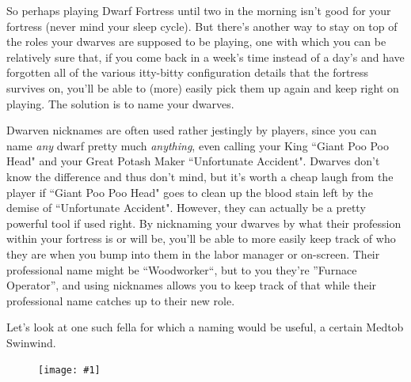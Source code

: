 \documentclass[]{article}
\newcommand{\fullfigure}[1] {
\begin{figure}[h!]
\texttt{[image: \#1]}
\end{figure}
}
\begin{document}
So perhaps playing Dwarf Fortress until two in the morning isn't good for your fortress (never mind your
sleep cycle). But there's another way to stay on top of the roles your dwarves are supposed to be
playing, one with which you can be relatively sure that, if you come back in a week's time instead of a
day's and have forgotten all of the various itty-bitty configuration details that the fortress survives
on, you'll be able to (more) easily pick them up again and keep right on playing. The solution is to 
name your dwarves.

Dwarven nicknames are often used rather jestingly by players, since you can name \emph{any} dwarf pretty
much \emph{anything}, even calling your King ``Giant Poo Poo Head" and your Great Potash Maker
``Unfortunate Accident". Dwarves don't know the difference and thus don't mind, but it's worth a cheap
laugh from the player if ``Giant Poo Poo Head" goes to clean up the blood stain left by the demise of
``Unfortunate Accident". However, they can actually be a pretty powerful tool if used right. By
nicknaming your dwarves by what their profession within your fortress is or will be, you'll be able to
more easily keep track of who they are when you bump into them in the labor manager or on-screen. Their
professional name might be ``Woodworker``, but to you they're ''Furnace Operator'', and using nicknames
allows you to keep track of that while their professional name catches up to their new role.

Let's look at one such fella for which a naming would be useful, a certain Medtob Swinwind.

\fullfigure{Sec2Fig13}
\end{document}
